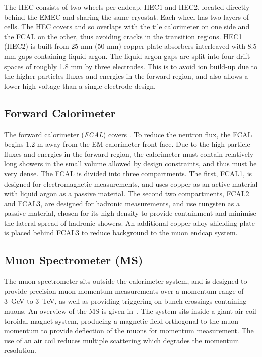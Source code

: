 The HEC consists of two wheels per endcap, HEC1 and HEC2, located directly
behind the EMEC and sharing the same cryostat. Each wheel has two layers of
cells. The HEC covers  and so overlaps with the tile
calorimeter on one side and the FCAL on the other, thus avoiding cracks in the
transition regions. HEC1 (HEC2) is built from 25 mm (50 mm) copper plate
absorbers interleaved with 8.5 mm gaps containing liquid argon. The liquid
argon gaps are split into four drift spaces of roughly 1.8 mm by three
electrodes. This is to avoid ion build-up due to the higher particles fluxes
and energies in the forward region, and also allows a lower high voltage than a single
electrode design.

\subsection{Forward Calorimeter}

The forward calorimeter ({\it FCAL}) covers . To reduce the
neutron flux, the FCAL begins 1.2 m away from the EM calorimeter
front face. Due to the high particle fluxes and energies in the forward region,
the calorimeter must contain relatively long showers in the small volume allowed
by design constraints, and thus must be very dense. The FCAL is divided into
three compartments. The first, FCAL1, is designed for electromagnetic
measurements, and uses copper as an active material with liquid argon as a
passive material. The second two compartments, FCAL2 and FCAL3, are designed for hadronic
measurements, and use tungsten as a passive material, chosen for its high
density to provide containment and minimise the lateral spread of hadronic
showers. An additional copper alloy shielding plate is placed behind FCAL3 to
reduce background to the muon endcap system.

\subsection{Muon Spectrometer (MS)}

The muon spectrometer sits outside the calorimeter system, and is designed to
provide precision muon momentum measurements over a momentum range of 3~GeV to
3~TeV, as well as providing triggering on bunch crossings containing
muons. An overview of the MS is given in~. The system sits
inside a giant air coil toroidal magnet system, producing a magnetic field
orthogonal to the muon momentum to provide deflection of the
muons for momentum measurement. The use of an air coil reduces multiple
scattering which degrades the momentum resolution.

